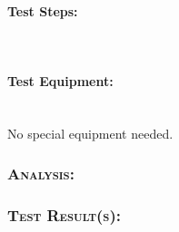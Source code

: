 \paragraph{Test Steps:}\mbox{}\\
\paragraph{Test Equipment:}\mbox{}\\
No special equipment needed.
\subsubsection{\textsc{\medium Analysis:}}
\subsubsection{\textsc{\medium Test Result(s):}}

\newpage

